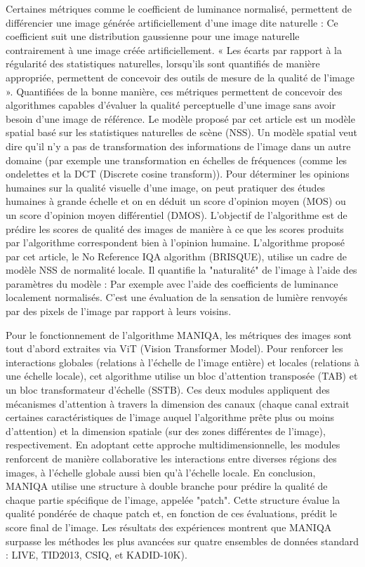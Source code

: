 \documentclass{ieeeaccess}
\begin{document}
 Certaines métriques comme le coefficient de luminance normalisé, permettent de différencier une image générée artificiellement d’une image dite naturelle : Ce coefficient suit une distribution gaussienne pour une image naturelle contrairement à une image créée artificiellement. « Les écarts par rapport à la régularité des statistiques naturelles, lorsqu'ils sont quantifiés de manière appropriée, permettent de concevoir des outils de mesure de la qualité de l'image ». Quantifiées de la bonne manière, ces métriques permettent de concevoir des algorithmes capables d'évaluer la qualité perceptuelle d'une image sans avoir besoin d'une image de référence. Le modèle proposé par cet article est un modèle spatial basé sur les statistiques naturelles de scène (NSS). Un modèle spatial veut dire qu’il n'y a pas de transformation des informations de l'image dans un autre domaine (par exemple une transformation en échelles de fréquences (comme les ondelettes et la DCT (Discrete cosine transform)). Pour déterminer les opinions humaines sur la qualité visuelle d’une image, on peut pratiquer des études humaines à grande échelle et on en déduit un score d’opinion moyen (MOS) ou un score d'opinion moyen différentiel (DMOS). L'objectif de l'algorithme est de prédire les scores de qualité des images de manière à ce que les scores produits par l'algorithme correspondent bien à l'opinion humaine. L’algorithme proposé par cet article, le No Reference IQA algorithm (BRISQUE), utilise un cadre de modèle NSS de normalité locale. Il quantifie la "naturalité" de l’image à l'aide des paramètres du modèle : Par exemple avec l’aide des coefficients de luminance localement normalisés. C'est une évaluation de la sensation de lumière renvoyés par des pixels de l’image par rapport à leurs voisins.

 Pour le fonctionnement de l’algorithme MANIQA, les métriques des images sont tout d’abord extraites via ViT (Vision Transformer Model). Pour renforcer les interactions globales (relations à l’échelle de l’image entière) et locales (relations à une échelle locale), cet algorithme utilise un bloc d'attention transposée (TAB) et un bloc transformateur d'échelle (SSTB). Ces deux modules appliquent des mécanismes d'attention à travers la dimension des canaux (chaque canal extrait certaines caractéristiques de l’image auquel l’algorithme prête plus ou moins d’attention) et la dimension spatiale (sur des zones différentes de l’image), respectivement. En adoptant cette approche multidimensionnelle, les modules renforcent de manière collaborative les interactions entre diverses régions des images, à l'échelle globale aussi bien qu'à l'échelle locale. En conclusion, MANIQA utilise une structure à double branche pour prédire la qualité de chaque partie spécifique de l'image, appelée "patch". Cette structure évalue la qualité pondérée de chaque patch et, en fonction de ces évaluations, prédit le score final de l'image. Les résultats des expériences montrent que MANIQA surpasse les méthodes les plus avancées sur quatre ensembles de données standard : LIVE, TID2013, CSIQ, et KADID-10K). 
\end{document}
